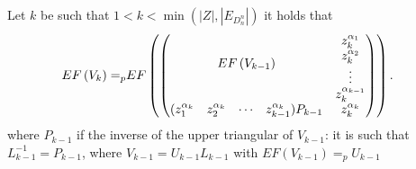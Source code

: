 \documentclass[11pt]{llncs}
\begin{document}
\begin{proposition}\label{prop:rowEchelonForm}
    Let $k$ be such that $1<k< \min{\left(|Z|,|E_{D_n^n}|\right)}$ it holds that
    \begin{align*}
        EF\left(V_{k}\right) =_p & EF
        \begin{pmatrix}
        \begin{pmatrix}
            \multicolumn{4}{c}{\multirow{4}{*}{$EF\left(V_{k-1}\right)$}} & z_k^{\alpha_1}\\
            & & & & z_k^{\alpha_2}\\
            & & & & \vdots\\
            & & & & z_{k}^{\alpha_{k-1}}\\
            (z_1^{\alpha_{k}} & z_2^{\alpha_{k}}& \cdots & z_{k-1}^{\alpha_{k}})P_{k-1} & z_{k}^{\alpha_k}
        \end{pmatrix}
        \end{pmatrix}.
    \end{align*}
    where $P_{k-1}$ if the inverse of the upper triangular of $V_{k-1}$: it is such that $L_{k-1}^{-1} = P_{k-1}$, where $V_{k-1} = U_{k-1}L_{k-1}$ with $EF(V_{k-1})=_p U_{k-1}$
\end{proposition}
\end{document}
